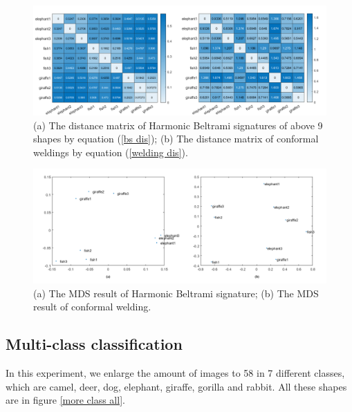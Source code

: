 \documentclass[review,onefignum,onetabnum]{siamonline190516}
\begin{document}
        \begin{figure}
            \begin{center}
                \includegraphics[width=13cm]{distance.png}
            \end{center}
            \caption{(a) The distance matrix of Harmonic Beltrami signatures of above 9 shapes by equation (\ref{bs dis}); (b) The distance matrix of conformal weldings by equation (\ref{welding dis}).}
            \label{dis matrix}
        \end{figure}

        \begin{figure}
            \begin{center}
                \includegraphics[width=13cm]{mds.png}
            \end{center}
            \caption{(a) The MDS result of Harmonic Beltrami signature; (b) The MDS result of conformal welding.}
            \label{mds1}
        \end{figure}
        
        

    \subsection{Multi-class classification}\label{more class}
        In this experiment, we enlarge the amount of images to 58 in 7 different classes, which are camel, deer, dog, elephant, giraffe, gorilla and rabbit. All these shapes are in figure \ref{more class all}.
        
\end{document}
